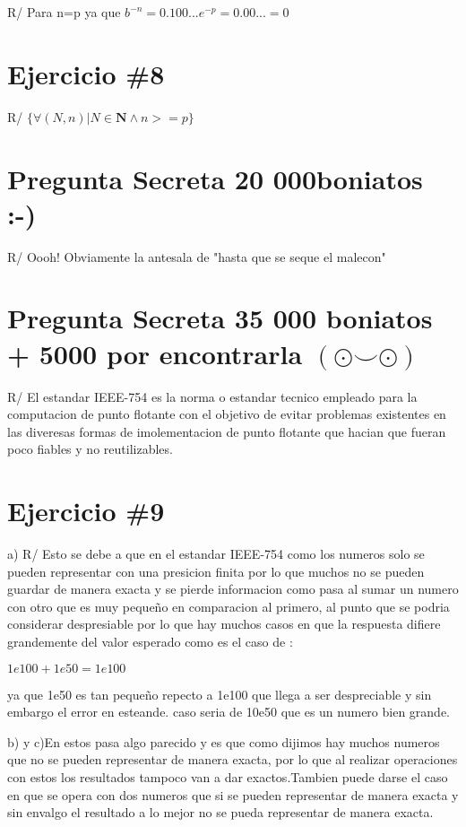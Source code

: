 \documentclass[a4paper,12pt]{article}
\begin{document}
R/ Para n=p ya que $b^{-n}=0.100...e^{-p} = 0.00... =0$

\section*{Ejercicio \#8}

R/ $ \{ \forall (N,n)| N\in \mathbf{N}  \land   n >= p \} $

\section*{Pregunta Secreta 20 000boniatos :-)}

R/ Oooh! Obviamente la antesala de "hasta que se seque el malecon" 

\section*{Pregunta Secreta 35 000 boniatos + 5000 por encontrarla $( \odot  \smile \odot )$}
R/ El estandar IEEE-754 es la norma o estandar tecnico empleado para la computacion de punto flotante
con el objetivo de evitar problemas existentes en las diveresas formas de imolementacion de punto flotante 
que hacian que fueran poco fiables y no reutilizables.

\section*{Ejercicio \#9}

a)
R/ Esto se debe a que en el estandar IEEE-754 como los numeros solo se pueden representar con una presicion finita
por lo que muchos no se pueden guardar de manera exacta y se pierde informacion como pasa al sumar un numero 
con otro que es muy pequeño en comparacion al primero, al punto que se podria considerar despresiable por lo que hay muchos
casos en que la respuesta difiere grandemente del valor esperado como es el caso de :
 
\begin{center}
    $1e100 + 1e50 = 1e100$
\end{center}

ya que 1e50 es tan 
pequeño repecto a 1e100 que llega a ser despreciable y sin embargo el error en esteande. caso seria de 10e50 que es un numero bien grande.


b) y c)En estos pasa algo parecido y es que como dijimos hay muchos numeros que no se pueden representar de manera exacta, por 
lo que al realizar operaciones con estos los resultados tampoco van a dar exactos.Tambien puede darse el caso en que se opera 
con dos numeros que si se pueden representar de manera exacta y sin envalgo el resultado a lo mejor no se pueda representar de manera exacta.
\end{document}
